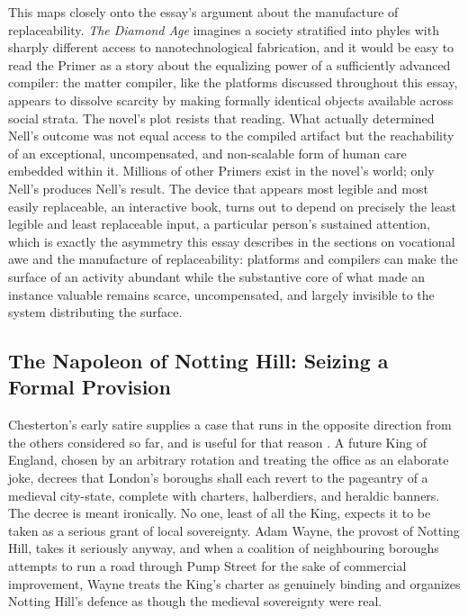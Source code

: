 \documentclass[11pt]{article}
\begin{document}
This maps closely onto the essay's argument about the manufacture of replaceability. \emph{The Diamond Age} imagines a society stratified into phyles with sharply different access to nanotechnological fabrication, and it would be easy to read the Primer as a story about the equalizing power of a sufficiently advanced compiler: the matter compiler, like the platforms discussed throughout this essay, appears to dissolve scarcity by making formally identical objects available across social strata. The novel's plot resists that reading. What actually determined Nell's outcome was not equal access to the compiled artifact but the reachability of an exceptional, uncompensated, and non-scalable form of human care embedded within it. Millions of other Primers exist in the novel's world; only Nell's produces Nell's result. The device that appears most legible and most easily replaceable, an interactive book, turns out to depend on precisely the least legible and least replaceable input, a particular person's sustained attention, which is exactly the asymmetry this essay describes in the sections on vocational awe and the manufacture of replaceability: platforms and compilers can make the surface of an activity abundant while the substantive core of what made an instance valuable remains scarce, uncompensated, and largely invisible to the system distributing the surface.

\subsection{The Napoleon of Notting Hill: Seizing a Formal Provision}

Chesterton's early satire supplies a case that runs in the opposite direction from the others considered so far, and is useful for that reason \citep{chesterton1904napoleon}. A future King of England, chosen by an arbitrary rotation and treating the office as an elaborate joke, decrees that London's boroughs shall each revert to the pageantry of a medieval city-state, complete with charters, halberdiers, and heraldic banners. The decree is meant ironically. No one, least of all the King, expects it to be taken as a serious grant of local sovereignty. Adam Wayne, the provost of Notting Hill, takes it seriously anyway, and when a coalition of neighbouring boroughs attempts to run a road through Pump Street for the sake of commercial improvement, Wayne treats the King's charter as genuinely binding and organizes Notting Hill's defence as though the medieval sovereignty were real.
\end{document}
